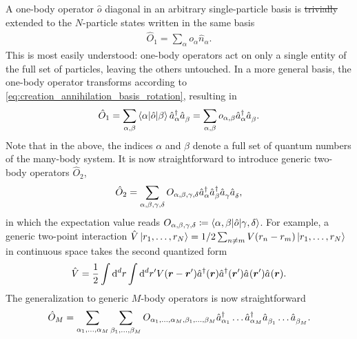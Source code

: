 \documentclass{svmono}
\def\rd{\mathrm d}
\def\pdag{{\vphantom\dag}}
\providecommand{\DIFaddtex}[1]{{\protect\color{blue}\uwave{#1}}} %
\providecommand{\DIFdeltex}[1]{{\protect\color{red}\sout{#1}}}                      %
\providecommand{\DIFaddbegin}{} %
\providecommand{\DIFaddend}{} %
\providecommand{\DIFdelbegin}{} %
\providecommand{\DIFdelend}{} %
\providecommand{\DIFadd}[1]{\texorpdfstring{\DIFaddtex{#1}}{#1}} %
\providecommand{\DIFdel}[1]{\texorpdfstring{\DIFdeltex{#1}}{}} %
\newcommand{\DIFscaledelfig}{0.5}
\newlength{\DIFdelgraphicswidth} %
\newlength{\DIFdelgraphicsheight} %
\newcommand{\DIFaddincludegraphics}[2][]{{\color{blue}\fbox{\DIFOincludegraphics[#1]{#2}}}} %
\newcommand{\DIFdelincludegraphics}[2][]{%
\sbox{\DIFdelgraphicsbox}{\DIFOincludegraphics[#1]{#2}}%
\settoboxwidth{\DIFdelgraphicswidth}{\DIFdelgraphicsbox} %
\settoboxtotalheight{\DIFdelgraphicsheight}{\DIFdelgraphicsbox} %
\scalebox{\DIFscaledelfig}{%
\parbox[b]{\DIFdelgraphicswidth}{\usebox{\DIFdelgraphicsbox}\\[-\baselineskip] \rule{\DIFdelgraphicswidth}{0em}}\llap{\resizebox{\DIFdelgraphicswidth}{\DIFdelgraphicsheight}{%
\setlength{\unitlength}{\DIFdelgraphicswidth}%
\begin{picture}(1,1)%
\thicklines\linethickness{2pt} %
{\color[rgb]{1,0,0}\put(0,0){\framebox(1,1){}}}%
{\color[rgb]{1,0,0}\put(0,0){\line( 1,1){1}}}%
{\color[rgb]{1,0,0}\put(0,1){\line(1,-1){1}}}%
\end{picture}%
}\hspace*{3pt}}} %
} %
\DeclareRobustCommand{\DIFaddbegin}{\DIFOaddbegin \let\includegraphics\DIFaddincludegraphics} %
\DeclareRobustCommand{\DIFaddend}{\DIFOaddend \let\includegraphics\DIFOincludegraphics} %
\DeclareRobustCommand{\DIFdelbegin}{\DIFOdelbegin \let\includegraphics\DIFdelincludegraphics} %
\DeclareRobustCommand{\DIFdelend}{\DIFOaddend \let\includegraphics\DIFOincludegraphics} %
\begin{document}
\DIFdelend A one-body operator $\hat o$ diagonal in an arbitrary single-particle basis is \DIFdelbegin \DIFdel{trivially }\DIFdelend \DIFaddbegin \DIFadd{then }\DIFaddend extended to the $N$-particle states written in the same basis\DIFaddbegin \DIFadd{, i.e.
}\DIFaddend \begin{align}
    \hat O_1
    = \sum_{\alpha} o_{\alpha}\hat n_{\alpha}.
\end{align}
This is most easily understood: one-body operators act on only a single entity of the full set of particles, leaving the others untouched.
In a more general basis, the one-body operator transforms according to \cref{eq:creation_annihilation_basis_rotation}, resulting in
\begin{align}
    \hat O_1 = \sum_{\alpha, \beta}\braket{\alpha | \hat o | \beta} \hat a^\dag_\alpha \hat a^\pdag_\beta = \sum_{\alpha,\beta}o_{\alpha,\beta}\hat a^\dag_\alpha \hat a^\pdag_\beta.
    \label{eq:one_body_operator}
\end{align}
Note that in the above, the indices $\alpha$ and $\beta$ denote a full set of quantum numbers of the many-body system.
It is now straightforward to introduce generic two-body operators $\hat O_2$,
\begin{align}
    \hat O_2 = \sum_{\alpha,\beta,\gamma,\delta}O_{\alpha,\beta,\gamma,\delta}\hat a^\dag_\alpha \hat a^\dag_\beta \hat a^\pdag_\gamma \hat a^\pdag_\delta,
\end{align}
in which the expectation value reads $O_{\alpha,\beta,\gamma,\delta}\coloneqq \braket{\alpha,\beta | \hat o | \gamma,\delta}$.
For example, a generic two-point interaction $\hat V\ket{r_1,\dots,r_N}=1/2\sum_{n\neq m}V(r_n-r_m)\ket{r_1,\dots,r_N}$ in continuous space takes the second quantized form
\begin{align}
    \hat V = \frac12\int{\rd^d r}\int{\rd^d r'}V({\bm r}-{\bm r'})\hat a^\dag({\bm r})\hat a^\dag({\bm r'})\hat a^\pdag({\bm r'})\hat a^\pdag({\bm r}).
    \label{eq:two_point_interaction}
\end{align}
The generalization to generic $M$-body operators is now straightforward
\begin{align}
    \hat O_M = \sum_{\alpha_1,\dots,\alpha_M}\sum_{\beta_1,\dots,\beta_M}O_{\alpha_1,\dots,\alpha_M,\beta_1,\dots,\beta_M}\hat a^\dag_{\alpha_1}\dots \hat a^\dag_{\alpha_M}\hat a^\pdag_{\beta_1}\dots \hat a^\pdag_{\beta_M}.
\end{align}
\end{document}
